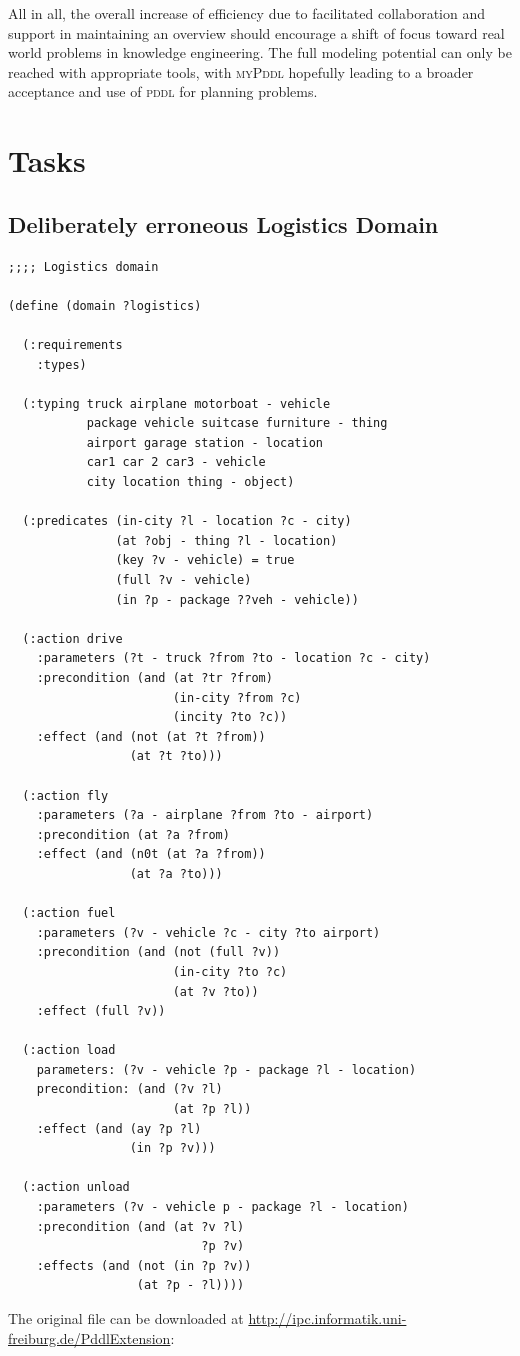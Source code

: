 \documentclass[runningheads]{llncs}
\newcommand{\mypddl}{\textsc{myPddl}\xspace}
\newcommand{\pddl}{\textsc{pddl}\xspace}
\begin{document}
All in all, the overall increase of efficiency due to facilitated
collaboration and support in maintaining an overview should encourage
a shift of focus toward real world problems in knowledge
engineering. The full modeling potential can only be reached with
appropriate tools, with \mypddl hopefully leading to a broader
acceptance and use of \pddl for planning problems.



\newpage
\appendix

\section{Tasks}
\label{sub:tasks}
\subsection{Deliberately erroneous Logistics Domain}
\label{logistics}
\begin{verbatim}
;;;; Logistics domain

(define (domain ?logistics)

  (:requirements
    :types) 

  (:typing truck airplane motorboat - vehicle
           package vehicle suitcase furniture - thing
           airport garage station - location
           car1 car 2 car3 - vehicle
           city location thing - object)

  (:predicates (in-city ?l - location ?c - city)
               (at ?obj - thing ?l - location)
               (key ?v - vehicle) = true
               (full ?v - vehicle)
               (in ?p - package ??veh - vehicle))

  (:action drive
    :parameters (?t - truck ?from ?to - location ?c - city)
    :precondition (and (at ?tr ?from)
                       (in-city ?from ?c)
                       (incity ?to ?c))
    :effect (and (not (at ?t ?from))
                 (at ?t ?to)))

  (:action fly
    :parameters (?a - airplane ?from ?to - airport)
    :precondition (at ?a ?from)
    :effect (and (n0t (at ?a ?from))
                 (at ?a ?to)))

  (:action fuel
    :parameters (?v - vehicle ?c - city ?to airport)
    :precondition (and (not (full ?v))
                       (in-city ?to ?c)
                       (at ?v ?to))
    :effect (full ?v))                   

  (:action load
    parameters: (?v - vehicle ?p - package ?l - location)
    precondition: (and (?v ?l)
                       (at ?p ?l))
    :effect (and (ay ?p ?l)
                 (in ?p ?v)))

  (:action unload
    :parameters (?v - vehicle p - package ?l - location)
    :precondition (and (at ?v ?l)
                           ?p ?v)
    :effects (and (not (in ?p ?v))
                  (at ?p - ?l))))
                \end{verbatim}
The original file can be downloaded at
\url{http://ipc.informatik.uni-freiburg.de/PddlExtension}:
\end{document}
